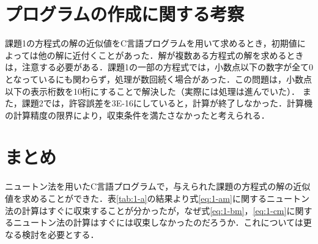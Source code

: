 \documentclass[12pt]{jarticle}
\renewcommand  \[  {\begin{eqnarray}}
\renewcommand  \]  {\end{eqnarray}}
\begin{document}
\section{プログラムの作成に関する考察}
課題1の方程式の解の近似値をC言語プログラムを用いて求めるとき，初期値によっては他の解に近付くことがあった．解が複数ある方程式の解を求めるときは，注意する必要がある．課題1の一部の方程式では，小数点以下の数字が全て0となっているにも関わらず，処理が数回続く場合があった．この問題は，小数点以下の表示桁数を10桁にすることで解決した（実際には処理は進んでいた）．
また，課題2では，許容誤差を3E-16にしていると，計算が終了しなかった．計算機の計算精度の限界により，収束条件を満たさなかったと考えられる．
\section{まとめ}
ニュートン法を用いたC言語プログラムで，与えられた課題の方程式の解の近似値を求めることができた．表\ref{tab:1-a}の結果より式\ref{eq:1-am}に関するニュートン法の計算はすぐに収束することが分かったが，なぜ式\ref{eq:1-bm}，\ref{eq:1-cm}に関するニュートン法の計算はすぐには収束しなかったのだろうか．これについては更なる検討を必要とする．
\end{document}
